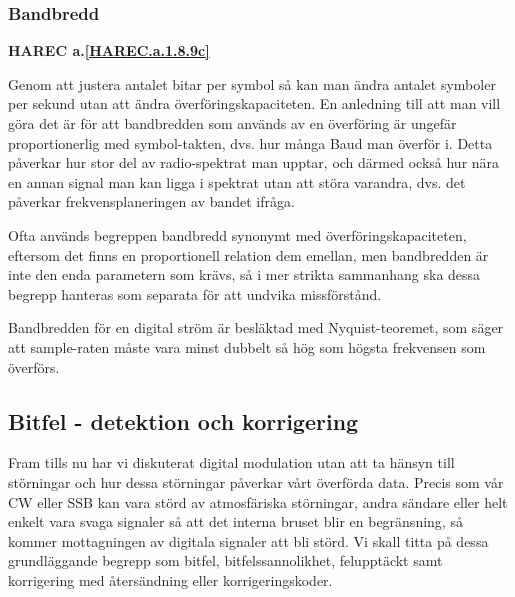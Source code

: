 \subsubsection{Bandbredd}
\textbf{HAREC a.\ref{HAREC.a.1.8.9c}\label{myHAREC.a.1.8.9c}}
\begin{rev-nytt}[MAD]

Genom att justera antalet bitar per symbol så kan man ändra antalet symboler
per sekund utan att ändra överföringskapaciteten. En anledning till att man
vill göra det är för att bandbredden som används av en överföring är ungefär
proportionerlig med symbol-takten, dvs. hur många Baud man överför i.
Detta påverkar hur stor del av radio-spektrat man upptar, och därmed också hur
nära en annan signal man kan ligga i spektrat utan att störa varandra, dvs.
det påverkar frekvensplaneringen av bandet ifråga.

Ofta används begreppen bandbredd synonymt med överföringskapaciteten, eftersom
det finns en proportionell relation dem emellan, men bandbredden är inte den
enda parametern som krävs, så i mer strikta sammanhang ska dessa begrepp
hanteras som separata för att undvika missförstånd.

Bandbredden för en digital ström är besläktad med Nyquist-teoremet, som säger
att sample-raten måste vara minst dubbelt så hög som högsta frekvensen som
överförs.

\end{rev-nytt}

\subsection{Bitfel - detektion och korrigering}
\begin{rev-nytt}[MAD]

Fram tills nu har vi diskuterat digital modulation utan att ta hänsyn till
störningar och hur dessa störningar påverkar vårt överförda data. Precis som
vår CW eller SSB kan vara störd av atmosfäriska störningar, andra sändare
eller helt enkelt vara svaga signaler så att det interna bruset blir en
begränsning, så kommer mottagningen av digitala signaler att bli störd.
Vi skall titta på dessa grundläggande begrepp som bitfel, bitfelssannolikhet,
felupptäckt samt korrigering med återsändning eller korrigeringskoder.

\end{rev-nytt}

